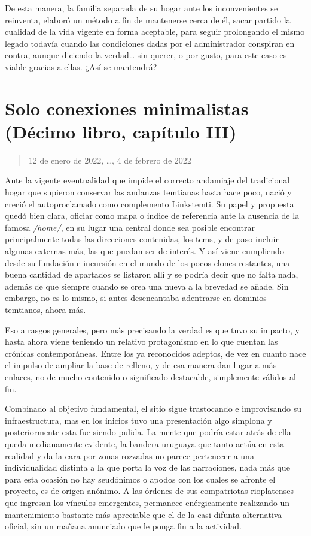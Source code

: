 \documentclass[
]{book}
\begin{document}
De esta manera, la familia separada de su hogar ante los inconvenientes se reinventa, elaboró un método a fin de mantenerse cerca de él, sacar partido la cualidad de la vida vigente en forma aceptable, para seguir prolongando el mismo legado todavía cuando las condiciones dadas por el administrador conspiran en contra, aunque diciendo la verdad\ldots{} sin querer, o por gusto, para este caso es viable gracias a ellas. ¿Así se mantendrá?

\hypertarget{solo-conexiones-minimalistas-duxe9cimo-libro-capuxedtulo-iii}{%
\section{Solo conexiones minimalistas (Décimo libro, capítulo III)}\label{solo-conexiones-minimalistas-duxe9cimo-libro-capuxedtulo-iii}}

\begin{quote}
12 de enero de 2022, \ldots, 4 de febrero de 2022
\end{quote}

Ante la vigente eventualidad que impide el correcto andamiaje del tradicional hogar que supieron conservar las andanzas temtianas hasta hace poco, nació y creció el autoproclamado como complemento Linkstemti. Su papel y propuesta quedó bien clara, oficiar como mapa o indice de referencia ante la ausencia de la famosa \emph{/home/}, en su lugar una central donde sea posible encontrar principalmente todas las direcciones contenidas, los tems, y de paso incluir algunas externas más, las que puedan ser de interés. Y así viene cumpliendo desde su fundación e incursión en el mundo de los pocos clones restantes, una buena cantidad de apartados se listaron allí y se podría decir que no falta nada, además de que siempre cuando se crea una nueva a la brevedad se añade. Sin embargo, no es lo mismo, si antes desencantaba adentrarse en dominios temtianos, ahora más.

Eso a rasgos generales, pero más precisando la verdad es que tuvo su impacto, y hasta ahora viene teniendo un relativo protagonismo en lo que cuentan las crónicas contemporáneas. Entre los ya reconocidos adeptos, de vez en cuanto nace el impulso de ampliar la base de relleno, y de esa manera dan lugar a más enlaces, no de mucho contenido o significado destacable, simplemente válidos al fin.

Combinado al objetivo fundamental, el sitio sigue trastocando e improvisando su infraestructura, mas en los inicios tuvo una presentación algo simplona y posteriormente esta fue siendo pulida. La mente que podría estar atrás de ella queda medianamente evidente, la bandera uruguaya que tanto actúa en esta realidad y da la cara por zonas rozzadas no parece pertenecer a una individualidad distinta a la que porta la voz de las narraciones, nada más que para esta ocasión no hay seudónimos o apodos con los cuales se afronte el proyecto, es de origen anónimo. A las órdenes de sus compatriotas rioplatenses que ingresan los vínculos emergentes, permanece enérgicamente realizando un mantenimiento bastante más apreciable que el de la casi difunta alternativa oficial, sin un mañana anunciado que le ponga fin a la actividad.
\end{document}
